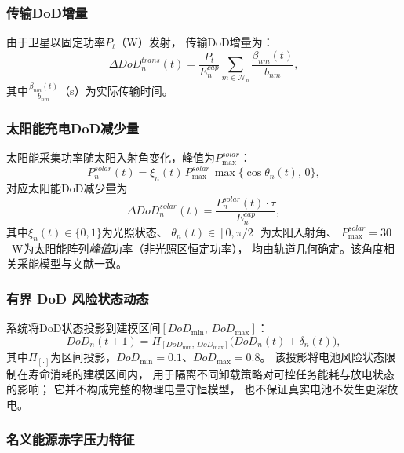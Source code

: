 \documentclass[a4paper,11pt]{article}
\begin{document}
\subsubsection{传输DoD增量}

由于卫星以固定功率$P_t$（W）发射，
传输DoD增量为：
\begin{equation}
    \Delta DoD^{trans}_n(t) =
    \frac{P_t}{E^{cap}_n} \sum_{m \in \mathcal{N}_n}
    \frac{\beta_{nm}(t)}{b_{nm}},
    \label{eq:dod_trans}
\end{equation}
其中$\frac{\beta_{nm}(t)}{b_{nm}}$（s）为实际传输时间。

\subsubsection{太阳能充电DoD减少量}

太阳能采集功率随太阳入射角变化，峰值为$P^{solar}_{\max}$：
\begin{equation}
    P^{solar}_n(t) = \xi_n(t)\,P^{solar}_{\max}\,\max\{\cos\theta_n(t),\,0\},
    \label{eq:solar_power}
\end{equation}
对应太阳能DoD减少量为
\begin{equation}
    \Delta DoD^{solar}_n(t) =
    \frac{P^{solar}_n(t)\cdot\tau}{E^{cap}_n},
    \label{eq:dod_solar}
\end{equation}
其中$\xi_n(t) \in \{0,1\}$为光照状态、
$\theta_n(t)\in[0,\pi/2]$为太阳入射角、
$P^{solar}_{\max}=30$~W为太阳能阵列\emph{峰值}功率（非光照区恒定功率），
均由轨道几何确定。该角度相关采能模型与文献\cite{li2024battery}一致。

\subsubsection{有界 DoD 风险状态动态}

系统将DoD状态投影到建模区间$[DoD_{\min},\,DoD_{\max}]$：
\begin{equation}
    DoD_n(t\!+\!1) = \Pi_{[DoD_{\min},\,DoD_{\max}]}\!\big(
    DoD_n(t) + \delta_n(t)\big),
    \label{eq:dod_dynamics}
\end{equation}
其中$\Pi_{[\cdot]}$为区间投影，$DoD_{\min}=0.1$、$DoD_{\max}=0.8$。
该投影将电池风险状态限制在寿命消耗的建模区间内，
用于隔离不同卸载策略对可控任务能耗与放电状态的影响；
它并不构成完整的物理电量守恒模型，
也不保证真实电池不发生更深放电。

\subsubsection{名义能源赤字压力特征}
\end{document}
